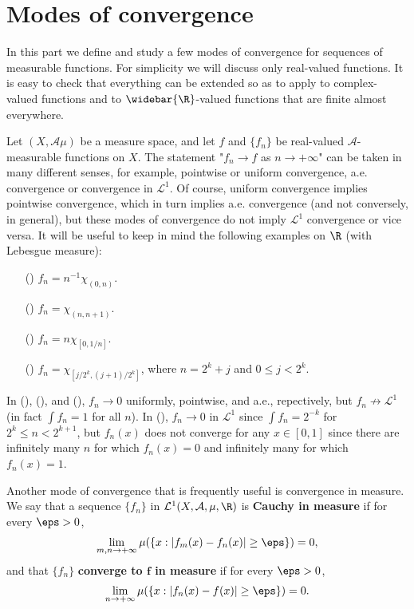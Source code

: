 \section{Modes of convergence}
In this part we define and study a few modes of convergence for sequences of measurable functions. For simplicity we will discuss only real-valued functions. It is easy to check that everything can be extended so as to apply to complex-valued functions and to $\widebar{\R}$-valued functions that are finite almost everywhere.\par
Let $(X,\mathcal{A}\mu)$ be a measure space, and let $f$ and $\{f_n\}$ be real-valued $\mathcal{A}$-measurable functions on $X$. The statement "$f_n\to f$ as $n\to+\infty$" can be taken in many different senses, for example, pointwise or uniform convergence, a.e. convergence or convergence in $\mathcal{L}^1$. Of course, uniform convergence implies pointwise convergence, which in turn implies a.e. convergence (and not conversely, in general), but these modes of convergence do not imply $\mathcal{L}^1$ convergence or vice versa. It will be useful to keep in mind the following examples on $\R$ (with Lebesgue measure):
\begin{itemize}
\item[(\rmnum{1})] $f_n=n^{-1}\chi_{(0,n)}$.
\item[(\rmnum{2})] $f_n=\chi_{(n,n+1)}$.
\item[(\rmnum{3})] $f_n=n\chi_{[0,1/n]}$.
\item[(\rmnum{4})] $f_n=\chi_{[j/2^k,(j+1)/2^k]}$, where $n=2^k+j$ and $0\leq j<2^k$.
\end{itemize}
In (), (), and (), $f_n\to 0$ uniformly, pointwise, and a.e., repectively, but $f_n\not\to\mathcal{L}^1$ (in fact  $\int f_n=1$ for all $n$). In (), $f_n\to 0$ in $\mathcal{L}^1$ since $\int f_n=2^{-k}$ for $2^k\leq n<2^{k+1}$, but $f_n(x)$ does not converge for any $x\in [0,1]$ since there are infinitely many $n$ for which $f_n(x)=0$ and infinitely many for which $f_n(x)=1$.\par
Another mode of convergence that is frequently useful is convergence in measure. We say that a sequence $\{f_n\}$ in $\mathcal{L}^1(X,\mathcal{A},\mu,\R)$ is \textbf{Cauchy in measure} if for every $\eps>0$,
\[\lim_{m,n\to+\infty}\mu(\{x:|f_m(x)-f_n(x)|\geq\eps\})=0,\]
and that $\{f_n\}$ \textbf{converge to $\bm{f}$ in measure} if for every $\eps>0$,
\begin{align}\label{converge in measure def}
\lim_{n\to+\infty}\mu(\{x:|f_n(x)-f(x)|\geq\eps\})=0.
\end{align}
